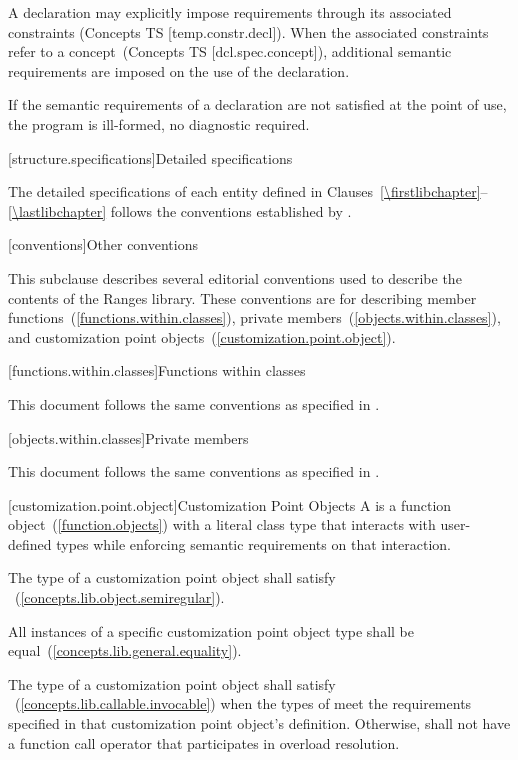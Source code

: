 \pnum
A declaration may explicitly impose requirements through its associated
constraints (Concepts TS [temp.constr.decl]). When the associated constraints
refer to a concept~(Concepts TS [dcl.spec.concept]), additional semantic requirements are
imposed on the use of the declaration.

\pnum
If the semantic requirements of a declaration are not satisfied at the
point of use, the program is ill-formed, no diagnostic required.

[structure.specifications]{Detailed specifications}

\pnum
The detailed specifications of each entity defined in
Clauses~\ref{\firstlibchapter}--\ref{\lastlibchapter} follows the conventions
established by .

[conventions]{Other conventions}
%

\pnum
This subclause describes several editorial conventions used to describe the contents
of the Ranges library. These conventions are for describing
member functions~(\ref{functions.within.classes}),
private members~(\ref{objects.within.classes}),
and customization point objects~(\ref{customization.point.object}).

[functions.within.classes]{Functions within classes}

\pnum
This document follows the same conventions as specified in .

[objects.within.classes]{Private members}

\pnum
This document follows the same conventions as specified in .

[customization.point.object]{Customization Point Objects}
\pnum
A  is a function object~(\ref{function.objects}) with a
literal class type that interacts with user-defined types while
enforcing semantic requirements on that interaction.

\pnum
The type of a customization point object shall satisfy
~(\ref{concepts.lib.object.semiregular}).

\pnum
All instances of a specific customization point object type shall
be equal~(\ref{concepts.lib.general.equality}).

\pnum
The type of a customization point object  shall satisfy
~(\ref{concepts.lib.callable.invocable}) when the types of
 meet the requirements specified in that
customization point object's definition. Otherwise, 
shall not have a function call operator that participates in
overload resolution.

